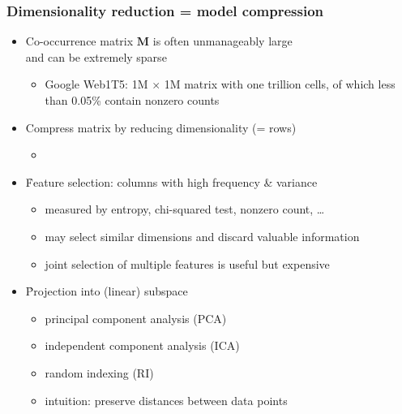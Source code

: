 \documentclass[t]{beamer} %
\begin{document}
\begin{frame}
  \frametitle{Dimensionality reduction = model compression}

  \begin{itemize}
  \item Co-occurrence matrix $\mathbf{M}$ is often unmanageably large\\
    and can be extremely sparse
    \begin{itemize}
    \item Google Web1T5: 1M $\times$ 1M matrix with one trillion
      cells, of which less than 0.05\% contain nonzero counts \citep{Evert:10a}
    \end{itemize}
  \item[\So] Compress matrix by reducing dimensionality (= rows)
    \begin{itemize}
    \item[]\pause
    \end{itemize}
  \item \h{Feature selection}: columns with high frequency \& variance
    \begin{itemize}
    \item measured by entropy, chi-squared test, nonzero count, \ldots
    \item may select similar dimensions and discard valuable information
    \item joint selection of multiple features is useful but expensive
    \end{itemize}
    \pause
  \item \h{Projection} into (linear) subspace
    \begin{itemize}
    \item principal component analysis (PCA)
    \item independent component analysis (ICA)
    \item random indexing (RI)
    \item[\hand] intuition: preserve distances between data points
    \end{itemize}
  \end{itemize}
\end{frame}
\end{document}
